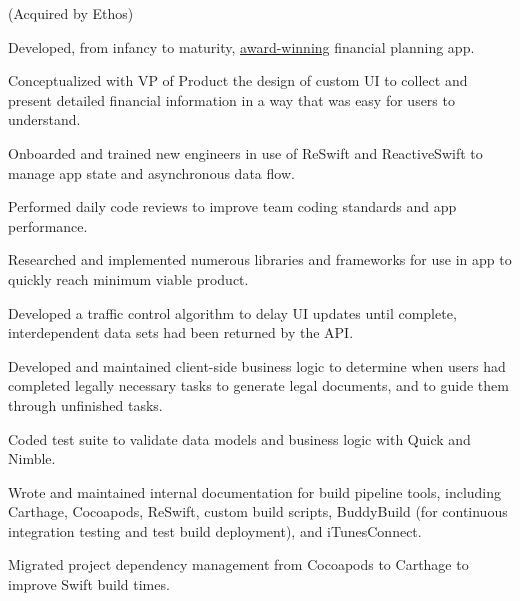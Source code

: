 \documentclass[]{jhearn-resume}
\begin{document}
\begin{minipage}[t]{0.64\textwidth} 
\vspace{-11pt}
\noindent\makebox[\linewidth]{\rule{1000pt}{0.4pt}}
\vspace{-5pt}

 (Acquired by Ethos)
\begin{tightemize}
\item Developed, from infancy to maturity, {\href{https://web.archive.org/web/20210728190109/https://tomorrow.me/trust-worthy/tomorrow-news/tomorrow-wins-at-plug-and-play-winter-summit/}{\color{blue1}award-winning}} financial planning app.
\item  Conceptualized with VP of Product the design of custom UI to collect and present detailed financial information in a way that was easy for users to understand.
\item  Onboarded and trained new engineers in use of ReSwift and ReactiveSwift to manage app state and asynchronous data flow.
\item  Performed daily code reviews to improve team coding standards and app performance.
\item  Researched and implemented numerous libraries and frameworks for use in app to quickly reach minimum viable product.
\item  Developed a traffic control algorithm to delay UI updates until complete, interdependent data sets had been returned by the API.
\item  Developed and maintained client-side business logic to determine when users had completed legally necessary tasks to generate legal documents, and to guide them through unfinished tasks.
\item  Coded test suite to validate data models and business logic with Quick and Nimble.
\item  Wrote and maintained internal documentation for build pipeline tools, including Carthage, Cocoapods, ReSwift, custom build scripts, BuddyBuild (for continuous integration testing and test build deployment), and iTunesConnect.
\item  Migrated project dependency management from Cocoapods to Carthage to improve Swift build times.
\end{tightemize}
\sectionsep



\end{minipage}
\end{document}
